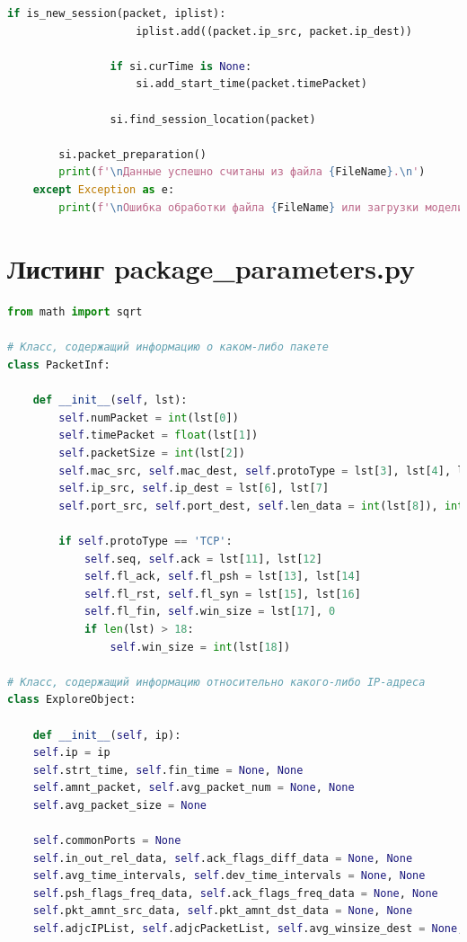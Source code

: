\documentclass[spec, och, diploma]{SCWorks}
\begin{document}
\begin{lstlisting}[language=Python]
                if is_new_session(packet, iplist):
                    iplist.add((packet.ip_src, packet.ip_dest))
                
                if si.curTime is None:
                    si.add_start_time(packet.timePacket)
                
                si.find_session_location(packet)
        
        si.packet_preparation()
        print(f'\nДанные успешно считаны из файла {FileName}.\n')
    except Exception as e:
        print(f'\nОшибка обработки файла {FileName} или загрузки модели: {e}\n')        
    \end{lstlisting}

    \section{Листинг package\_parameters.py}

    \begin{lstlisting}[language=Python]
from math import sqrt

# Класс, содержащий информацию о каком-либо пакете
class PacketInf:

    def __init__(self, lst):
        self.numPacket = int(lst[0])
        self.timePacket = float(lst[1])
        self.packetSize = int(lst[2])
        self.mac_src, self.mac_dest, self.protoType = lst[3], lst[4], lst[5]
        self.ip_src, self.ip_dest = lst[6], lst[7]
        self.port_src, self.port_dest, self.len_data = int(lst[8]), int(lst[9]), int(lst[10])

        if self.protoType == 'TCP':
            self.seq, self.ack = lst[11], lst[12]
            self.fl_ack, self.fl_psh = lst[13], lst[14]
            self.fl_rst, self.fl_syn = lst[15], lst[16]
            self.fl_fin, self.win_size = lst[17], 0
            if len(lst) > 18:
                self.win_size = int(lst[18])

# Класс, содержащий информацию относительно какого-либо IP-адреса
class ExploreObject:

    def __init__(self, ip):
    self.ip = ip
    self.strt_time, self.fin_time = None, None
    self.amnt_packet, self.avg_packet_num = None, None
    self.avg_packet_size = None

    self.commonPorts = None
    self.in_out_rel_data, self.ack_flags_diff_data = None, None
    self.avg_time_intervals, self.dev_time_intervals = None, None
    self.psh_flags_freq_data, self.ack_flags_freq_data = None, None
    self.pkt_amnt_src_data, self.pkt_amnt_dst_data = None, None
    self.adjcIPList, self.adjcPacketList, self.avg_winsize_dest = None, None, None
    \end{lstlisting}
\end{document}
